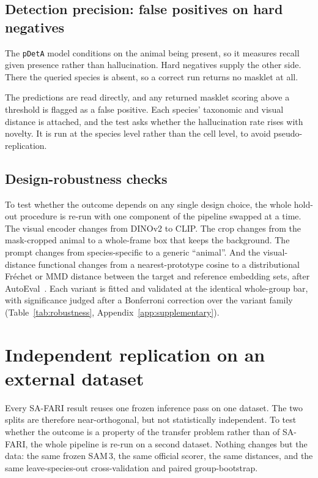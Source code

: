 \subsection{Detection precision: false positives on hard negatives}
\label{sec:meth-fp}
The \texttt{pDetA} model conditions on the animal being present, so it measures recall given presence rather
than hallucination. Hard negatives supply the other side. There the queried species is absent, so a correct run
returns no masklet at all.

The predictions are read directly, and any returned masklet scoring above a threshold is flagged as a false
positive. Each species' taxonomic and visual distance is attached, and the test asks whether the hallucination
rate rises with novelty. It is run at the species level rather than the cell level, to avoid pseudo-replication.

\subsection{Design-robustness checks}
\label{sec:meth-robustness}
To test whether the outcome depends on any single design choice, the whole hold-out procedure is re-run with
one component of the pipeline swapped at a time. The visual encoder changes from DINOv2 to CLIP. The crop
changes from the mask-cropped animal to a whole-frame box that keeps the background. The prompt changes from
species-specific to a generic ``animal''. And the visual-distance functional changes from a nearest-prototype
cosine to a distributional Fr\'echet or MMD distance between the target and reference embedding sets, after
AutoEval~\cite{autoeval}. Each variant is fitted and validated at the identical whole-group bar, with
significance judged after a Bonferroni correction over the variant family (Table~\ref{tab:robustness},
Appendix~\ref{app:supplementary}).

\section{Independent replication on an external dataset}
\label{sec:meth-replication}
Every SA-FARI result reuses one frozen inference pass on one dataset. The two splits are therefore
near-orthogonal, but not statistically independent. To test whether the outcome is a property of the transfer
problem rather than of SA-FARI, the whole pipeline is re-run on a second dataset. Nothing changes but the data:
the same frozen SAM\,3, the same official scorer, the same distances, and the same leave-species-out
cross-validation and paired group-bootstrap.

